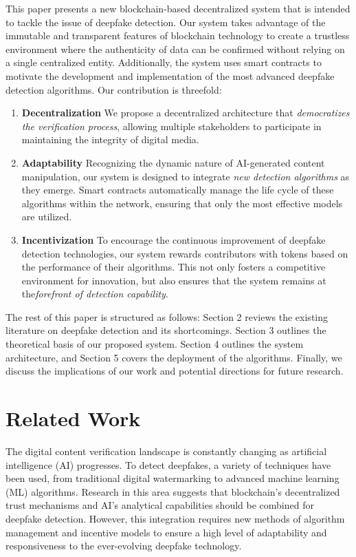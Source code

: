 \documentclass{article}
\begin{document}
This paper presents a new blockchain-based decentralized system that is intended to tackle the issue of deepfake detection. Our system takes advantage of the immutable and transparent features of blockchain technology to create a trustless environment where the authenticity of data can be confirmed without relying on a single centralized entity. Additionally, the system uses smart contracts to motivate the development and implementation of the most advanced deepfake detection algorithms. Our contribution is threefold:

\begin{enumerate}
    \item \textbf{Decentralization} We propose a decentralized architecture that \textit{democratizes the verification process}, allowing multiple stakeholders to participate in maintaining the integrity of digital media.
    \item \textbf{Adaptability} Recognizing the dynamic nature of AI-generated content manipulation, our system is designed to integrate \textit{new detection algorithms} as they emerge. Smart contracts automatically manage the life cycle of these algorithms within the network, ensuring that only the most effective models are utilized.
    \item \textbf{Incentivization} To encourage the continuous improvement of deepfake detection technologies, our system rewards contributors with tokens based on the performance of their algorithms. This not only fosters a competitive environment for innovation, but also ensures that the system remains at the\textit{forefront of detection capability}.
\end{enumerate}

The rest of this paper is structured as follows: Section 2 reviews the existing literature on deepfake detection and its shortcomings. Section 3 outlines the theoretical basis of our proposed system. Section 4 outlines the system architecture, and Section 5 covers the deployment of the algorithms. Finally, we discuss the implications of our work and potential directions for future research.

\section{Related Work}

The digital content verification landscape is constantly changing as artificial intelligence (AI) progresses. To detect deepfakes, a variety of techniques have been used, from traditional digital watermarking to advanced machine learning (ML) algorithms. Research in this area suggests that blockchain's decentralized trust mechanisms and AI's analytical capabilities should be combined for deepfake detection. However, this integration requires new methods of algorithm management and incentive models to ensure a high level of adaptability and responsiveness to the ever-evolving deepfake technology.
\end{document}

